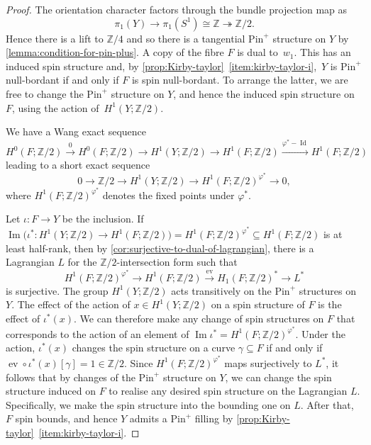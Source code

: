 \documentclass[a4paper, reqno]{amsart}
\theoremstyle{definition}
\theoremstyle{remark}
\newcommand{\Z}{\mathbb{Z}}
\newcommand{\im}{\operatorname{Im}}
\newcommand{\Id}{\operatorname{Id}}
\newcommand{\pinplus}{{\mathrm{Pin}^+}\!}
\DeclareMathOperator{\ev}{ev}
\begin{document}
\begin{proof} 
    The orientation character factors through the bundle projection map as
    \[\pi_1(Y) \to \pi_1(S^1) \cong \Z \twoheadrightarrow \Z/2.\]
    Hence there is a lift to $\Z/4$ and so there is a tangential $\pinplus$ structure on $Y$ by \cref{lemma:condition-for-pin-plus}. 
    A copy of the fibre $F$ is dual to~$w_1$. This has an induced spin structure and, by \cref{prop:Kirby-taylor}~\eqref{item:kirby-taylor-i},~$Y$ is $\pinplus$ null-bordant if and only if $F$ is spin null-bordant. To arrange the latter, we are free to change the $\pinplus$ structure on $Y$, and hence the induced spin structure on $F$, using the action of~$H^1(Y;\Z/2)$. 

We have a Wang exact sequence
\begin{equation}\label{eq:wang}
H^0(F;\Z/2) \xrightarrow{0} H^0(F;\Z/2) \to H^1(Y;\Z/2) \to H^1(F;\Z/2) \xrightarrow{\varphi^* - \Id} H^1(F;\Z/2)
\end{equation}
leading to a short exact sequence
\[0 \to \Z/2 \to H^1(Y;\Z/2) \to H^1(F;\Z/2)^{\varphi^*} \to 0,\]
where $H^1(F;\Z/2)^{\varphi^*}$ denotes the fixed points under $\varphi^*$.

Let $\iota \colon F \to Y$ be the inclusion. If  $\im\big(\iota^* \colon H^1(Y;\Z/2) \to H^1(F;\Z/2)\big) = H^1(F;\Z/2)^{\varphi^*} \subseteq H^1(F;\Z/2)$ is at least half-rank, then by \cref{cor:surjective-to-dual-of-lagrangian}, there is a Lagrangian $L$ for the $\Z/2$-intersection form such that 
\[H^1(F;\Z/2)^{\varphi^*} \to H^1(F;\Z/2) \xrightarrow{\ev} H_1(F;\Z/2)^* \to L^*\]
     is surjective. 
    The group $H^1(Y;\Z/2)$ acts transitively on the $\pinplus$ structures on $Y$. The effect of the action of $x \in H^1(Y;\Z/2)$ on a spin structure of $F$ is the effect of $\iota^*(x)$. We can therefore make any change of spin structures on $F$ that corresponds to the action of an element of $ \im \iota^* = H^1(F;\Z/2)^{\varphi^*}$. Under the action, $\iota^*(x)$ changes the spin structure on a curve $\gamma \subseteq F$ if and only if $\ev \circ \iota^*(x)[\gamma] =1 \in \Z/2$. Since $H^1(F;\Z/2)^{\varphi^*}$  maps surjectively to $L^*$, it follows that by changes of the $\pinplus$ structure on $Y$, we can change the spin structure induced on $F$ to realise any desired spin structure on the Lagrangian $L$. Specifically, we make the spin structure into the bounding one on $L$. After that, $F$ spin bounds, and hence $Y$ admits a  $\pinplus$ filling by \cref{prop:Kirby-taylor}~\eqref{item:kirby-taylor-i}.  
\end{proof}
\end{document}
